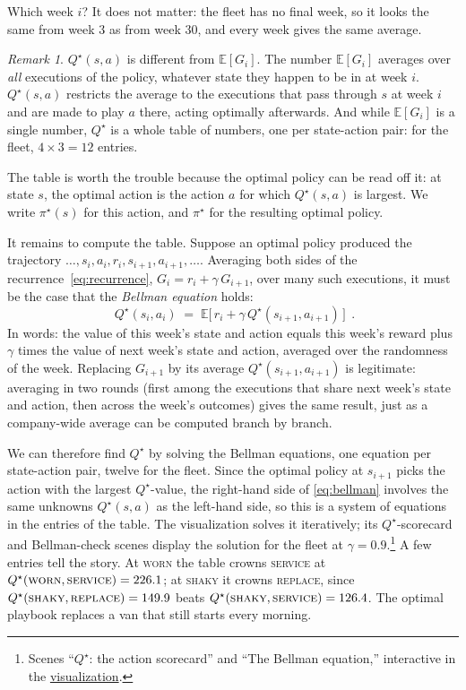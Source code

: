 \documentclass[11pt,a4paper]{article}
\theoremstyle{definition}
\theoremstyle{remark}
\newtheorem{remark}[definition]{Remark}
\numberwithin{equation}{section}
\newcommand{\E}{\mathbb{E}}
\newcommand{\sa}[1]{\textsc{#1}}   %
\newcommand{\vizhref}[1]{\href{https://sml-fs26.github.io/classic_rl/repair-or-replace/}{#1}}
\begin{document}
Which week $i$? It does not matter: the fleet has no final week, so it looks the same from
week $3$ as from week $30$, and every week gives the same average.

\begin{remark}
$Q^\star(s, a)$ is different from $\E[G_i]$. The number $\E[G_i]$ averages over \emph{all}
executions of the policy, whatever state they happen to be in at week $i$. $Q^\star(s, a)$
restricts the average to the executions that pass through $s$ at week $i$ and are made to
play $a$ there, acting optimally afterwards. And while $\E[G_i]$ is a single number,
$Q^\star$ is a whole table of numbers, one per state-action pair: for the fleet,
$4 \times 3 = 12$ entries.
\end{remark}

The table is worth the trouble because the optimal policy can be read off it: at state $s$,
the optimal action is the action $a$ for which $Q^\star(s, a)$ is largest. We write
$\pi^\star(s)$ for this action, and $\pi^\star$ for the resulting optimal policy.

It remains to compute the table. Suppose an optimal policy produced the trajectory
$\dots, s_i, a_i, r_i, s_{i+1}, a_{i+1}, \dots$. Averaging both sides of the
recurrence~\eqref{eq:recurrence}, $G_i = r_i + \gamma\, G_{i+1}$, over many such executions,
it must be the case that the \emph{Bellman equation} holds:
\begin{equation}\label{eq:bellman}
\boxed{\;Q^\star(s_i, a_i) \;=\; \E\bigl[\, r_i + \gamma\, Q^\star(s_{i+1}, a_{i+1}) \,\bigr]\;}\,.
\end{equation}
In words: the value of this week's state and action equals this week's reward plus $\gamma$
times the value of next week's state and action, averaged over the randomness of the week.
Replacing $G_{i+1}$ by its average $Q^\star(s_{i+1}, a_{i+1})$ is legitimate: averaging in
two rounds (first among the executions that share next week's state and action, then across
the week's outcomes) gives the same result, just as a company-wide average can be computed
branch by branch.

We can therefore find $Q^\star$ by solving the Bellman equations, one equation per
state-action pair, twelve for the fleet. Since the optimal policy at $s_{i+1}$ picks the
action with the largest $Q^\star$-value, the right-hand side of \eqref{eq:bellman} involves
the same unknowns $Q^\star(s, a)$ as the left-hand side, so this is a system of equations in
the entries of the table. The visualization solves it iteratively; its $Q^\star$-scorecard
and Bellman-check scenes display the solution for the fleet at
$\gamma = 0.9$.\footnote{Scenes ``$Q^\star$: the action scorecard'' and ``The Bellman
equation,'' interactive in the \vizhref{visualization}.} A few entries tell the story. At
\sa{worn} the table crowns \sa{service} at $Q^\star(\sa{worn}, \sa{service}) = 226.1$; at
\sa{shaky} it crowns \sa{replace}, since $Q^\star(\sa{shaky}, \sa{replace}) = 149.9$ beats
$Q^\star(\sa{shaky}, \sa{service}) = 126.4$. The optimal playbook replaces a van that still
starts every morning.
\end{document}
